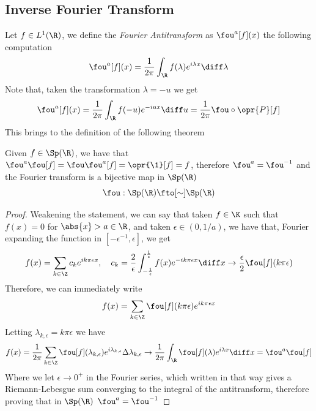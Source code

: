 \documentclass[../mmf.tex]{subfiles}
\begin{document}
\subsection{Inverse Fourier Transform}
\begin{dfn}
	Let $f\in L^1(\R)$, we define the \textit{Fourier Antitransform} as $\fou^a[f](x)$ the following computation
	\begin{equation}
		\fou^a[f](x)=\frac{1}{2\pi}\int_{\R}^{}f(\lambda)e^{i\lambda x}\diff\lambda
		\label{eq:fouantitransform}
	\end{equation}
	Note that, taken the transformation $\lambda=-u$ we get
	\begin{equation*}
		\fou^a[f](x)=\frac{1}{2\pi}\int_{\R}^{}f(-u)e^{-iux}\diff u=\frac{1}{2\pi}\fou\circ\opr{P}[f]
		\label{eq:antitrasfopform}
	\end{equation*}
	This brings to the definition of the following theorem
\end{dfn}
\begin{thm}
	Given $f\in\Sp(\R)$, we have that $\fou^a\fou[f]=\fou\fou^a[f]=\opr{\1}[f]=f$, therefore $\fou^a=\fou^{-1}$ and the Fourier transform is a bijective map in $\Sp(\R)$
	\begin{equation*}
		\fou:\Sp(\R)\fto[\sim]\Sp(\R)
	\end{equation*}
\end{thm}
\begin{proof}
	Weakening the statement, we can say that taken $f\in\K$ such that $f(x)=0$ for $\abs{x}>a\in\R$, and taken $\epsilon\in(0,1/a)$, we have that, Fourier expanding the function in $[-\epsilon^{-1},\epsilon]$, we get
	\begin{equation*}
		f(x)=\sum_{k\in\Z}^{}c_ke^{ik\pi\epsilon x},\quad c_k=\frac{2}{\epsilon}\int_{-\frac{1}{\epsilon}}^{\frac{1}{\epsilon}}f(x)e^{-ik\pi\epsilon x}\diff x\to\frac{\epsilon}{2}\fou[f](k\pi\epsilon)
	\end{equation*}
	Therefore, we can immediately write
	\begin{equation*}
		f(x)=\sum_{k\in\Z}\fou[f](k\pi\epsilon)e^{ik\pi\epsilon x}
	\end{equation*}
	Letting $\lambda_{k,\epsilon}=k\pi\epsilon$ we have
	\begin{equation*}
		f(x)=\frac{1}{2\pi}\sum_{k\in\Z}^{}\fou[f](\lambda_{k,\epsilon})e^{i\lambda_{k,\epsilon}}\Delta\lambda_{k,\epsilon}\to\frac{1}{2\pi}\int_{\R}^{}\fou[f](\lambda)e^{i\lambda x}\diff x=\fou^a\fou[f]
	\end{equation*}
	Where we let $\epsilon\to0^+$ in the Fourier series, which written in that way gives a Riemann-Lebesgue sum converging to the integral of the antitransform, therefore proving that in $\Sp(\R)$ $\fou^a=\fou^{-1}$
\end{proof}
\end{document}
